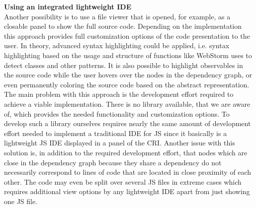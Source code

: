 \noindent\textbf{Using an integrated lightweight IDE}\\
Another possibility is to use a file viewer that is opened, for example, as a closable panel to show the full source code. Depending on the implementation this approach provides full customization options of the code presentation to the user. In theory, advanced syntax highlighting could be applied, i.e. syntax highlighting based on the usage and structure of functions like WebStorm uses to detect classes and other patterns. It is also possible to highlight observables in the source code while the user hovers over the nodes in the dependency graph, or even permanently coloring the source code based on the abstract representation. The main problem with this approach is the development effort required to achieve a viable implementation. There is no library available, that we are aware of, which provides the needed functionality and customization options. To develop such a library ourselves requires nearly the same amount of development effort needed to implement a traditional IDE for JS since it basically is a lightweight JS IDE displayed in a panel of the CRI. Another issue with this solution is, in addition to the required development effort, that nodes which are close in the dependency graph because they share a dependency do not necessarily correspond to lines of code that are located in close proximity of each other. The code may even be split over several JS files in extreme cases which requires additional view options by any lightweight IDE apart from just showing one JS file.\\

